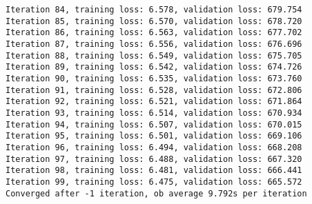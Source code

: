 \documentclass[11pt]{article}
\begin{document}
\begin{Verbatim}[commandchars=\\\{\}]
Iteration 84, training loss: 6.578, validation loss: 679.754
Iteration 85, training loss: 6.570, validation loss: 678.720
Iteration 86, training loss: 6.563, validation loss: 677.702
Iteration 87, training loss: 6.556, validation loss: 676.696
Iteration 88, training loss: 6.549, validation loss: 675.705
Iteration 89, training loss: 6.542, validation loss: 674.726
Iteration 90, training loss: 6.535, validation loss: 673.760
Iteration 91, training loss: 6.528, validation loss: 672.806
Iteration 92, training loss: 6.521, validation loss: 671.864
Iteration 93, training loss: 6.514, validation loss: 670.934
Iteration 94, training loss: 6.507, validation loss: 670.015
Iteration 95, training loss: 6.501, validation loss: 669.106
Iteration 96, training loss: 6.494, validation loss: 668.208
Iteration 97, training loss: 6.488, validation loss: 667.320
Iteration 98, training loss: 6.481, validation loss: 666.441
Iteration 99, training loss: 6.475, validation loss: 665.572
Converged after -1 iteration, ob average 9.792s per iteration
    \end{Verbatim}
\end{document}
